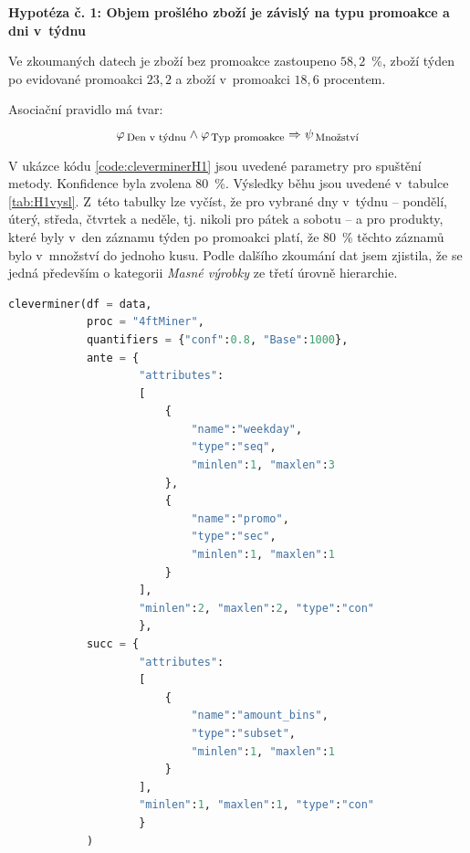 \textbf{Hypotéza č. 1: Objem prošlého zboží je závislý na typu promoakce a dni v~týdnu}

Ve zkoumaných datech je zboží bez promoakce zastoupeno $58{,}2$~\%, zboží týden po evidované promoakci $23{,}2$ a zboží v~promoakci $18{,}6$ procentem. 

Asociační pravidlo má tvar:
\begin{equation}
    \varphi_{\mbox{\,\footnotesize Den v~týdnu}} \land \varphi_{\,\mbox{\footnotesize Typ promoakce}} \Rightarrow \psi_{\mbox{\,\footnotesize Množství}}
\end{equation}

V ukázce kódu \ref*{code:cleverminerH1} jsou uvedené parametry pro spuštění metody. Konfidence byla zvolena 80~\%. Výsledky běhu jsou uvedené v~tabulce \ref*{tab:H1vysl}. Z~této tabulky lze vyčíst, že pro vybrané dny v~týdnu -- pondělí, úterý, středa, čtvrtek a neděle, tj. nikoli pro pátek a sobotu -- a pro produkty, které byly v~den záznamu týden po promoakci platí, že 80~\% těchto záznamů bylo v~množství do jednoho kusu. Podle dalšího zkoumání dat jsem zjistila, že se jedná především o kategorii \emph{Masné výrobky} ze třetí úrovně hierarchie.


\begin{lstlisting}[language=Python, style=mystyle, label={code:cleverminerH1}, caption={Hypotéza č. 1, funkce \texttt{cleverminer}.}]
cleverminer(df = data,
            proc = "4ftMiner", 
            quantifiers = {"conf":0.8, "Base":1000},
            ante = {
                    "attributes":
                    [
                        {
                            "name":"weekday", 
                            "type":"seq", 
                            "minlen":1, "maxlen":3
                        },
                        {
                            "name":"promo", 
                            "type":"sec", 
                            "minlen":1, "maxlen":1
                        }
                    ], 
                    "minlen":2, "maxlen":2, "type":"con"
                    },
            succ = {
                    "attributes":
                    [
                        {
                            "name":"amount_bins", 
                            "type":"subset", 
                            "minlen":1, "maxlen":1
                        }
                    ], 
                    "minlen":1, "maxlen":1, "type":"con"
                    }
            )
    \end{lstlisting}

